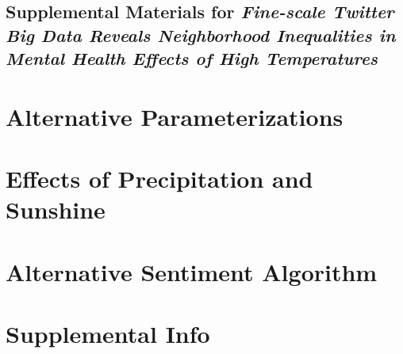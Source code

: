 \documentclass{article}
\begin{document}
\begin{center}
\section*{Supplemental Materials for \textit{Fine-scale Twitter Big Data Reveals Neighborhood Inequalities in Mental Health Effects of High Temperatures}}
\end{center}



\section{Alternative Parameterizations}

\section{Effects of Precipitation and Sunshine}

\section{Alternative Sentiment Algorithm}

\setcounter{table}{0}
\setcounter{figure}{0}
\setcounter{section}{0}
\renewcommand{\thetable}{S\arabic{table}}
\renewcommand{\thefigure}{S\arabic{figure}}
\renewcommand{\thesection}{S\arabic{section}}

\section*{Supplemental Info}
\setcounter{table}{0}
\setcounter{figure}{0}
\setcounter{section}{0}
\renewcommand{\thetable}{S\arabic{table}}
\renewcommand{\thefigure}{S\arabic{figure}}
\renewcommand{\thesection}{S\arabic{section}}
\end{document}
